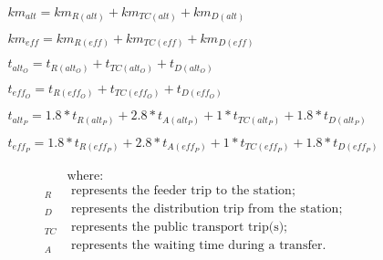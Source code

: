 \begin{refsegment}
\begin{equation}
\label{equation-chap5:effectif-alternatif}
\begin{array}{lclclclclclcl}
\displaystyle km_{alt} = km_{R(alt)} + km_{TC(alt)} + km_{D(alt)}\\\\
\displaystyle km_{eff} = km_{R(eff)} + km_{TC(eff)} + km_{D(eff)}\\\\
\displaystyle t_{alt_O} = t_{R(alt_O)} + t_{TC(alt_O)} + t_{D(alt_O)}\\\\
\displaystyle t_{eff_O} = t_{R(eff_O)} + t_{TC(eff_O)} + t_{D(eff_O)}\\\\
\displaystyle t_{alt_P} = 1.8*t_{R(alt_P)} + 2.8*t_{A(alt_P)} + 1*t_{TC(alt_P)} + 1.8*t_{D(alt_P)}\\\\
\displaystyle t_{eff_P} = 1.8*t_{R(eff_P)} + 2.8*t_{A(eff_P)} + 1*t_{TC(eff_P)} + 1.8*t_{D(eff_P)}
\end{array}
\end{equation}

\begin{align*}
    &\text{where:} \\
    _R &\text{ represents the feeder trip to the station;} \\
    _D &\text{ represents the distribution trip from the station;} \\
    _{TC} &\text{ represents the public transport trip(s);} \\
    _A &\text{ represents the waiting time during a transfer.}
\end{align*}


\end{refsegment}
